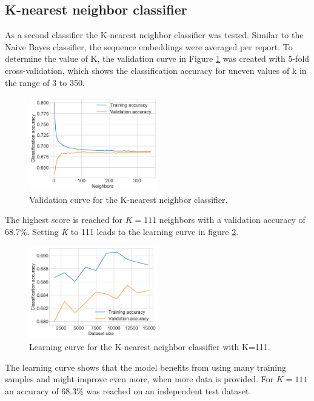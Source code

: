 \subsection{K-nearest neighbor classifier}
As a second classifier the K-nearest neighbor classifier was tested.
Similar to the Naive Bayes classifier, the sequence embeddings were averaged per report.
To determine the value of K, the validation curve in Figure \ref{figure:knn_validation} was created with 5-fold cross-validation, which shows the classification accuracy for uneven values of k in the range of 3 to 350.
\begin{figure}[h]
    \centering
    \includegraphics[width=0.5\textwidth]{figures/charts/knn_validation.png}
    \caption{Validation curve for the K-nearest neighbor classifier.}
    \label{figure:knn_validation}
\end{figure}
The highest score is reached for $K=111$ neighbors with a validation accuracy of 68.7\%.
Setting \textit{K} to 111 leads to the learning curve in figure \ref{figure:knn_learning}.
\begin{figure}[h]
    \centering
    \includegraphics[width=0.5\textwidth]{figures/charts/knn_learning.png}
    \caption{Learning curve for the K-nearest neighbor classifier with K=111.}
    \label{figure:knn_learning}
\end{figure}
The learning curve shows that the model benefits from using many training samples and might improve even more, when more data is provided.
For $K=111$ an accuracy of 68.3\% was reached on an independent test dataset.

